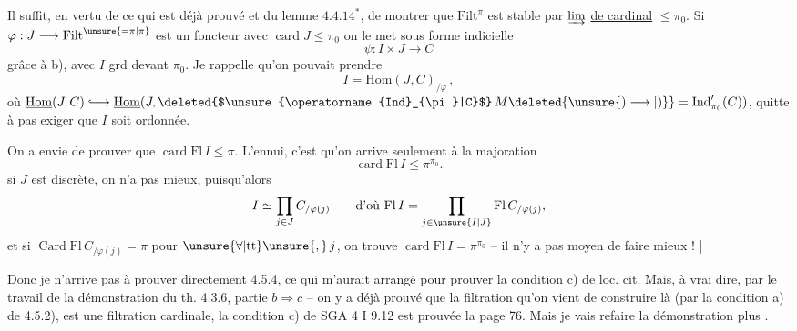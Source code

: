 Il suffit,  en vertu de ce qui est déjà prouvé et du lemme $4.4.14^{\ast}$, de montrer que $\mathrm{Filt}^\pi$ est stable par $\varinjlim$ \uline{de cardinal} $\leq\pi_0$.
Si $\varphi:J\longrightarrow\mathrm{Filt}^{\unsure{=\pi|\pi}}$ est un foncteur avec $\operatorname{card}J\leq\pi_0$ on le met sous forme indicielle
\[ \psi:I\times J\longrightarrow C \]
grâce à  b), avec $I$ grd devant $\pi_0$.
Je rappelle qu'on pouvait prendre
\[ I=\underline{\mathrm{Hom}}(J,C)_{/\varphi}\,, \]
où $\underline{\mathrm{Hom}}(J,C)\lhook\joinrel\longrightarrow\underline{\mathrm{Hom}}(J,\text{\deleted{$\unsure{\operatorname{Ind}_{\pi}|C}$}}\,M\deleted{\unsure{)\longrightarrow|)}}=\operatorname{Ind}'_{\pi_0}(C))$, quitte à  pas exiger que $I$ soit ordonnée.

On a envie de prouver que $\operatorname{card}\mathrm{Fl}\,I\leq\pi$. L'ennui, c'est qu'on arrive seulement à la majoration
\[ \operatorname{card}\mathrm{Fl}\,I\leq\pi^{\pi_0}. \]
 
si $J$ est discrète, on n'a pas mieux, puisqu'alors
\[ I\simeq\prod_{j\in J} C_{/\varphi(j)}
\qquad\text{d'où }\mathrm{Fl}\,I=\prod_{j\in\unsure{I|J}}\mathrm{Fl}\,C_{/\varphi(j)}, \]
et si $\operatorname{Card}\mathrm{Fl}\,C_{/\varphi(j)}=\pi$ pour $\unsure{\forall|\mathrm{tt}}\unsure{,}\,j$, on trouve $\operatorname{card}\mathrm{Fl}\,I=\pi^{\pi_0}$ -- il n'y a pas moyen de faire mieux ! ]

Donc je n'arrive pas à prouver directement 4.5.4, ce qui m'aurait arrangé pour prouver la condition c) de loc. cit.
Mais, à vrai dire,    par le travail de la démonstration du th. 4.3.6, partie $b\Rightarrow c$ -- on y a déjà prouvé que la filtration qu'on vient de construire là (par la condition a)  de 4.5.2), est une filtration cardinale,  la condition c) de SGA 4 I 9.12 est prouvée  la page 76. Mais je vais refaire
la démonstration plus .

